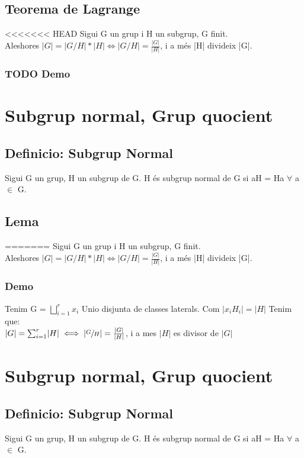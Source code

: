 \documentclass[11pt]{article}
\begin{document}
\subsection{Teorema de Lagrange}
<<<<<<< HEAD
\label{sec:orgd671b39}
Sigui G un grup i H un subgrup, G finit. \\
Aleshores \(|G| = |G/H| * |H| \iff |G/H| = \frac{|G|}{|H|}\), i a més |H| divideix |G|.

\subsubsection{{\bfseries\sffamily TODO} Demo}
\label{sec:orgf59f5f9}

\section{Subgrup normal, Grup quocient}
\label{sec:org35fe8d0}
\subsection{Definicio: Subgrup Normal}
\label{sec:org3519ded}
Sigui G un grup, H un subgrup de G. H és subgrup normal de G si aH = Ha \(\forall\) a \(\in\) G.
\subsection{Lema}
\label{sec:orgc970438}
=======
\label{sec:org14f755e}
Sigui G un grup i H un subgrup, G finit. \\
Aleshores \(|G| = |G/H| * |H| \iff |G/H| = \frac{|G|}{|H|}\), i a més |H| divideix |G|.

\subsubsection{Demo}
\label{sec:org23c402c}
    Tenim G = \(\bigsqcup_{i=1}^{r} x_{i}\) Unio disjunta de classes laterals. Com \(\rvert  x_{i}H_{i}  \lvert =  \rvert  H  \lvert\) Tenim que: \\
\(\lvert G  \rvert = \sum_{i=1}^{r}  \lvert H  \rvert \iff  \lvert \sfrac{G}{H} \rvert = \frac{\lvert G \rvert}{\lvert H \rvert}\), i a mes \(\lvert H \rvert\) es divisor de  \(\lvert G \rvert\)  

\section{Subgrup normal, Grup quocient}
\label{sec:orgabb190f}
\subsection{Definicio: Subgrup Normal}
\label{sec:org1aeac77}
Sigui G un grup, H un subgrup de G. H és subgrup normal de G si aH = Ha \(\forall\) a \(\in\) G.
\end{document}
